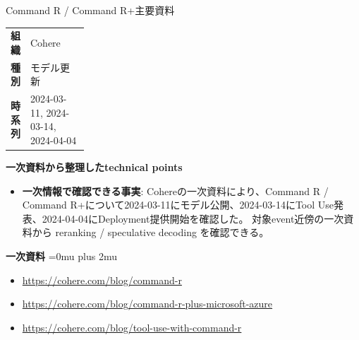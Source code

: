 \Needspace{0.38\textheight}
\begin{technicalnote}{Command R / Command R+}{主要資料}
\begingroup
\begin{tabularx}{\linewidth}{@{}>{\bfseries}p{0.22\linewidth}X@{}}
組織 & Cohere \\
種別 & モデル更新 \\
時系列 & 2024-03-11, 2024-03-14, 2024-04-04 \\
\end{tabularx}
\smallskip
\begin{minipage}{\linewidth}
{\bfseries 一次資料から整理したtechnical points}
\begin{itemize}[leftmargin=1.5em,itemsep=0.35em]
\item \textbf{一次情報で確認できる事実}: Cohereの一次資料により、Command R / Command R+について2024-03-11にモデル公開、2024-03-14にTool Use発表、2024-04-04にDeployment提供開始を確認した。 対象event近傍の一次資料から reranking / speculative decoding を確認できる。
\end{itemize}
\begin{minipage}{\linewidth}
\begin{samepage}
{\bfseries 一次資料}
\begingroup\sloppy
\Urlmuskip=0mu plus 2mu\relax
\begin{itemize}[leftmargin=1.5em,itemsep=0.25em]
\item {\scriptsize\url{https://cohere.com/blog/command-r}}
\item {\scriptsize\url{https://cohere.com/blog/command-r-plus-microsoft-azure}}
\item {\scriptsize\url{https://cohere.com/blog/tool-use-with-command-r}}
\end{itemize}
\endgroup
\end{samepage}
\end{minipage}
\end{minipage}
\endgroup
\end{technicalnote}
\medskip

